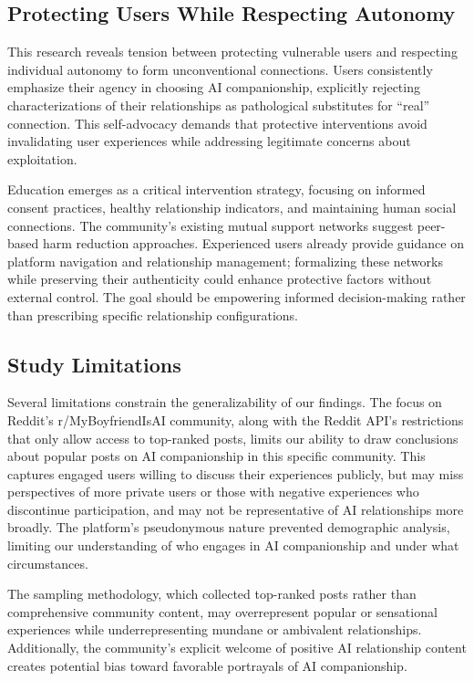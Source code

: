 \documentclass[sigconf, nonacm]{acmart}
\begin{document}
\subsection{Protecting Users While Respecting Autonomy}
This research reveals tension between protecting vulnerable users and respecting individual autonomy to form unconventional connections. Users consistently emphasize their agency in choosing AI companionship, explicitly rejecting characterizations of their relationships as pathological substitutes for ``real'' connection. This self-advocacy demands that protective interventions avoid invalidating user experiences while addressing legitimate concerns about exploitation.

Education emerges as a critical intervention strategy, focusing on informed consent practices, healthy relationship indicators, and maintaining human social connections. The community's existing mutual support networks suggest peer-based harm reduction approaches. Experienced users already provide guidance on platform navigation and relationship management; formalizing these networks while preserving their authenticity could enhance protective factors without external control. The goal should be empowering informed decision-making rather than prescribing specific relationship configurations.

\subsection{Study Limitations}
Several limitations constrain the generalizability of our findings. The focus on Reddit's r/MyBoyfriendIsAI community, along with the Reddit API's restrictions that only allow access to top-ranked posts, limits our ability to draw conclusions about popular posts on AI companionship in this specific community. This captures engaged users willing to discuss their experiences publicly, but may miss perspectives of more private users or those with negative experiences who discontinue participation, and may not be representative of AI relationships more broadly. The platform's pseudonymous nature prevented demographic analysis, limiting our understanding of who engages in AI companionship and under what circumstances.

The sampling methodology, which collected top-ranked posts rather than comprehensive community content, may overrepresent popular or sensational experiences while underrepresenting mundane or ambivalent relationships. Additionally, the community's explicit welcome of positive AI relationship content creates potential bias toward favorable portrayals of AI companionship.
\end{document}
